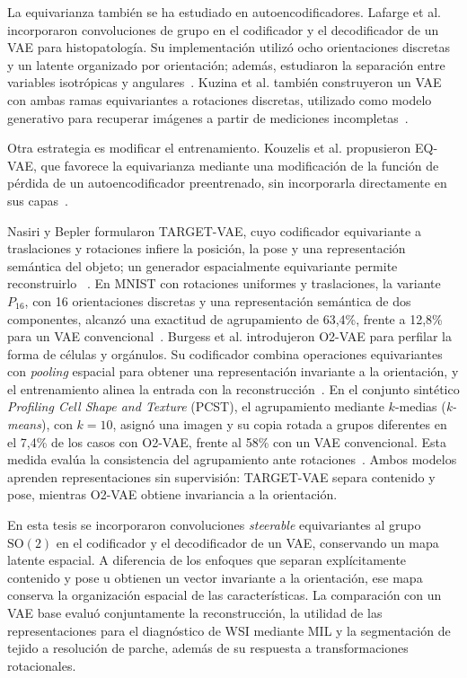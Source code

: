 \begingroup{}
La equivarianza también se ha estudiado en autoencodificadores. Lafarge et al.
incorporaron convoluciones de grupo en el codificador y el decodificador de un
VAE para histopatología. Su implementación utilizó ocho orientaciones discretas
y un latente organizado por orientación; además, estudiaron la separación
entre variables isotrópicas y angulares~\cite{lafarge_orientation_2020}.
Kuzina et al. también construyeron un VAE con ambas ramas equivariantes a
rotaciones discretas, utilizado como modelo generativo para recuperar imágenes
a partir de mediciones incompletas~\cite{kuzina_equivariant_2022}.
\par\endgroup

Otra estrategia es modificar el entrenamiento. Kouzelis et al. propusieron
EQ-VAE, que favorece la equivarianza mediante una modificación de la función
de pérdida de un autoencodificador preentrenado, sin incorporarla directamente
en sus capas~\cite{kouzelis_eqvae_2025}.

Nasiri y Bepler formularon TARGET-VAE, cuyo codificador equivariante a traslaciones y
rotaciones infiere la posición, la pose y una representación semántica del
objeto; un generador espacialmente equivariante permite reconstruirlo
~\cite{nasiri_target_2022}. En MNIST con rotaciones uniformes y traslaciones,
la variante \(P_{16}\), con 16 orientaciones discretas y una representación
semántica de dos componentes, alcanzó una exactitud de agrupamiento de
63,4\%, frente a 12,8\% para un VAE convencional~\cite{nasiri_target_2022}.
Burgess et al. introdujeron O2-VAE
para perfilar la forma de células y orgánulos. Su codificador combina
operaciones equivariantes con \emph{pooling} espacial para obtener una
representación invariante a la orientación, y el entrenamiento alinea la
entrada con la reconstrucción~\cite{burgess_orientation_2024}. En el conjunto
sintético \emph{Profiling Cell Shape and Texture} (PCST), el agrupamiento
mediante \(k\)-medias (\emph{k-means}), con \(k=10\), asignó una imagen y su
copia rotada a grupos diferentes en el 7,4\% de los casos con O2-VAE, frente
al 58\% con un VAE convencional. Esta medida evalúa la consistencia del
agrupamiento ante rotaciones~\cite{burgess_orientation_2024}. Ambos modelos
aprenden representaciones sin supervisión: TARGET-VAE separa contenido y pose,
mientras O2-VAE obtiene invariancia a la orientación.

En esta tesis se incorporaron convoluciones \emph{steerable} equivariantes al
grupo \(\mathrm{SO}(2)\) en el codificador y el decodificador de un VAE,
conservando un mapa latente espacial. A diferencia de los enfoques que separan
explícitamente contenido y pose u obtienen un vector invariante a la
orientación, ese mapa conserva la organización espacial de las
características. La comparación con un VAE base evaluó conjuntamente la
reconstrucción, la utilidad de las representaciones para el diagnóstico de
WSI mediante MIL y la segmentación de tejido a resolución de parche, además
de su respuesta a transformaciones rotacionales.
